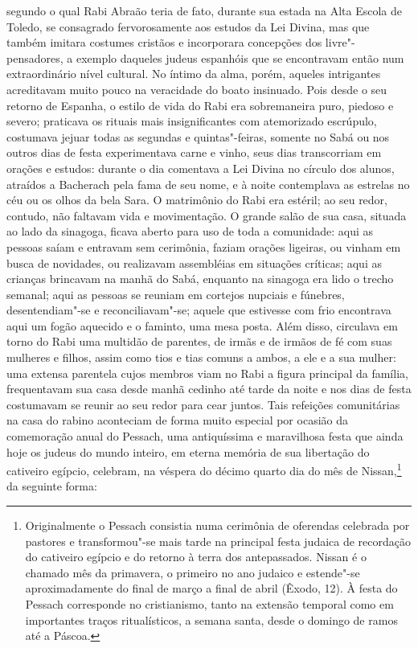 segundo o qual Rabi Abraão teria de fato, durante sua estada na Alta
Escola de Toledo, se consagrado fervorosamente aos estudos da Lei
Divina, mas que também imitara costumes cristãos e incorporara
concepções dos livre"-pensadores, a exemplo daqueles judeus espanhóis
que se encontravam então num extraordinário nível cultural. No íntimo
da alma, porém, aqueles intrigantes acreditavam muito pouco na
veracidade do boato insinuado. Pois desde o seu retorno de Espanha, o
estilo de vida do Rabi era sobremaneira puro, piedoso e severo;
praticava os rituais mais insignificantes com atemorizado escrúpulo,
costumava jejuar todas as segundas e quintas"-feiras, somente no Sabá
ou nos outros dias de festa experimentava carne e vinho, seus dias
transcorriam em orações e estudos: durante o dia comentava a Lei Divina
no círculo dos alunos, atraídos a Bacherach pela fama de seu nome, e à
noite contemplava as estrelas no céu ou os olhos da bela Sara. O
matrimônio do Rabi era estéril; ao seu redor, contudo, não faltavam
vida e movimentação. O grande salão de sua casa, situada ao lado da
sinagoga, ficava aberto para uso de toda a comunidade: aqui as pessoas
saíam e entravam sem cerimônia, faziam orações ligeiras, ou vinham em
busca de novidades, ou realizavam assembléias em situações críticas;
aqui as crianças brincavam na manhã do Sabá, enquanto na sinagoga era
lido o trecho semanal; aqui as pessoas se reuniam em cortejos nupciais
e fúnebres, desentendiam"-se e reconciliavam"-se; aquele que
estivesse com frio encontrava aqui um fogão aquecido e o faminto, uma
mesa posta. Além disso, circulava em torno do Rabi uma multidão de
parentes, de irmãs e de irmãos de fé com suas mulheres e filhos, assim
como tios e tias comuns a ambos, a ele e a sua mulher: uma extensa
parentela cujos membros viam no Rabi a figura principal da família,
frequentavam sua casa desde manhã cedinho até tarde da noite e nos dias
de festa costumavam se reunir ao seu redor para cear juntos. Tais
refeições comunitárias na casa do rabino aconteciam de forma muito
especial por ocasião da comemoração anual do Pessach, uma antiquíssima
e maravilhosa festa que ainda hoje os judeus do mundo inteiro, em
eterna memória de sua libertação do cativeiro egípcio, celebram, na
véspera do décimo quarto dia do mês de
Nissan,\footnote{ Originalmente o Pessach consistia numa cerimônia de oferendas celebrada
por pastores e transformou"-se mais tarde na principal festa judaica
de recordação do cativeiro egípcio e do retorno à terra dos
antepassados. Nissan é o chamado mês da primavera, o primeiro no
ano judaico e estende"-se aproximadamente do final de março a final de
abril (Êxodo, 12). À festa do Pessach corresponde no cristianismo,
tanto na extensão temporal como em importantes traços ritualísticos, a
semana santa, desde o domingo de ramos até a Páscoa.}
da seguinte forma:

